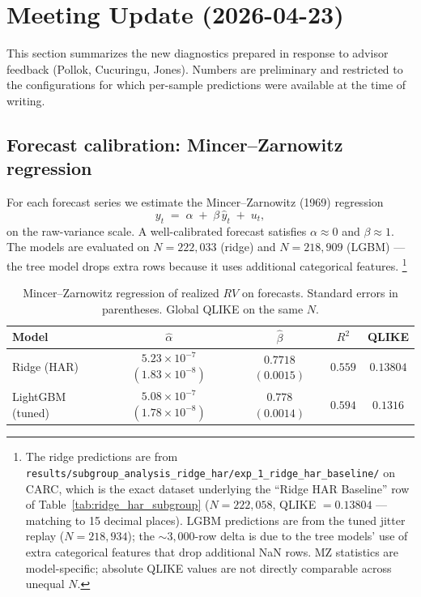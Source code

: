 \section{Meeting Update (2026-04-23)}
\label{sec:meeting_update}

This section summarizes the new diagnostics prepared in response to
advisor feedback (Pollok, Cucuringu, Jones). Numbers are preliminary
and restricted to the configurations for which per-sample predictions
were available at the time of writing.

\subsection{Forecast calibration: Mincer--Zarnowitz regression}
\label{sec:mz_regression}

For each forecast series we estimate the Mincer--Zarnowitz (1969)
regression
\begin{equation}
    y_t \;=\; \alpha \;+\; \beta\, \hat{y}_t \;+\; u_t,
    \label{eq:mz}
\end{equation}
on the raw-variance scale. A well-calibrated forecast satisfies
$\alpha \approx 0$ and $\beta \approx 1$. The models are evaluated on
$N = 222{,}033$ (ridge) and $N = 218{,}909$ (LGBM) --- the tree model
drops extra rows because it uses additional categorical features.%
\footnote{The ridge predictions are from
\texttt{results/subgroup\_analysis\_ridge\_har/exp\_1\_ridge\_har\_baseline/}
on CARC, which is the exact dataset underlying the ``Ridge HAR
Baseline'' row of Table~\ref{tab:ridge_har_subgroup}
($N = 222{,}058$, QLIKE $= 0.13804$ --- matching to 15 decimal
places). LGBM predictions are from the tuned jitter replay
($N = 218{,}934$); the $\sim\!3{,}000$-row delta is due to the tree
models' use of extra categorical features that drop additional NaN
rows. MZ statistics are model-specific; absolute QLIKE values are not
directly comparable across unequal $N$.}

\begin{table}[H]
\centering
\caption{Mincer--Zarnowitz regression of realized $RV$ on forecasts.
Standard errors in parentheses. Global QLIKE on the same $N$.}
\label{tab:mz}
\begin{tabular}{lcccc}
\toprule
Model & $\hat\alpha$ & $\hat\beta$ & $R^2$ & QLIKE \\
\midrule
Ridge (HAR) & $5.23\!\times\!10^{-7}$ $(1.83\!\times\!10^{-8})$ & $0.7718$ $(0.0015)$ & $0.559$ & $0.13804$ \\
LightGBM (tuned) & $5.08\!\times\!10^{-7}$ $(1.78\!\times\!10^{-8})$ & $0.778$ $(0.0014)$ & $0.594$ & $0.1316$ \\
\bottomrule
\end{tabular}
\end{table}

